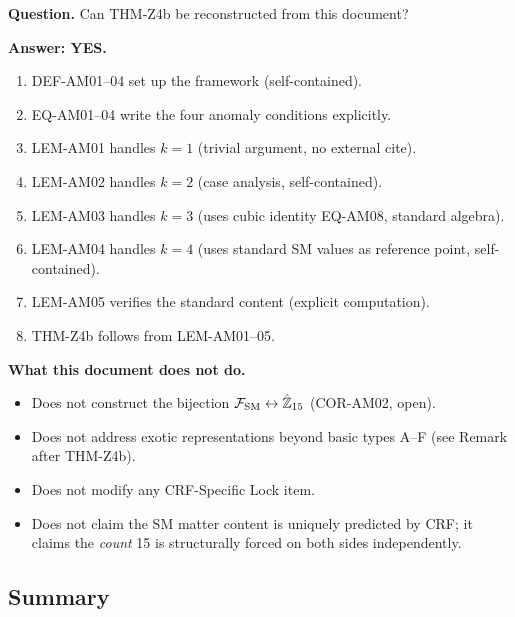 \documentclass[12pt, a4paper]{article}
\begin{document}
\begin{formalbox}[title={Reconstruction Test (CUIP No-Loss)}]
\textbf{Question.} Can THM-Z4b be reconstructed from this document?

\textbf{Answer: YES.}
\begin{enumerate}[leftmargin=*]
  \item DEF-AM01--04 set up the framework (self-contained).
  \item EQ-AM01--04 write the four anomaly conditions explicitly.
  \item LEM-AM01 handles $k=1$ (trivial argument, no external cite).
  \item LEM-AM02 handles $k=2$ (case analysis, self-contained).
  \item LEM-AM03 handles $k=3$ (uses cubic identity EQ-AM08,
    standard algebra).
  \item LEM-AM04 handles $k=4$ (uses standard SM values as
    reference point, self-contained).
  \item LEM-AM05 verifies the standard content (explicit computation).
  \item THM-Z4b follows from LEM-AM01--05.
\end{enumerate}

\textbf{What this document does not do.}
\begin{itemize}[leftmargin=*]
  \item Does not construct the bijection $\mathcal{F}_{\rm SM}
    \leftrightarrow \hat{\mathbb{Z}}_{15}$ (COR-AM02, open).
  \item Does not address exotic representations beyond basic types
    A--F (see Remark after THM-Z4b).
  \item Does not modify any CRF-Specific Lock item.
  \item Does not claim the SM matter content is uniquely predicted
    by CRF; it claims the \emph{count} 15 is structurally forced
    on both sides independently.
\end{itemize}
\end{formalbox}

\subsection{Summary}
\label{sec:summary}
\end{document}
